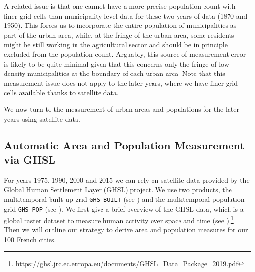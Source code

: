 \documentclass[11pt]{report}
\begin{document}
A related issue is that one cannot have a more precise population count with finer grid-cells than municipality level data for these two years of data (1870 and 1950). This forces us to incorporate the entire population of municipalities as part of the urban area, while, at the fringe of the urban area, some residents might be still working in the agricultural sector and should be in principle excluded from the population count. Arguably, this source of measurement error is likely to be quite minimal given that this concerns only the fringe of low-density municipalities at the boundary of each urban area. Note that this measurement issue does not apply to the later years, where we have finer grid-cells available thanks to satellite data.

We now turn to the measurement of urban areas and populations for the later years using satellite data.

\pagebreak

\subsection{Automatic Area and Population Measurement via GHSL}\label{A-sec:GHSL}

For years 1975, 1990, 2000 and 2015 we can rely on satellite data provided by the \href{https://ghsl.jrc.ec.europa.eu}{Global Human Settlement Layer (GHSL)} project. We use two products, the multitemporal built-up grid \texttt{GHS-BUILT} (see \cite{GHSL-built}) and the multitemporal population grid \texttt{GHS-POP} (see \cite{GHSL-pop}). We first give a brief overview of the GHSL data, which is a global raster dataset to measure human activity over space and time (see \cite{GHSL-datapack}).\footnote{\url{https://ghsl.jrc.ec.europa.eu/documents/GHSL_Data_Package_2019.pdf}} Then we will outline our strategy to derive area and population measures for our 100 French cities.
\end{document}
